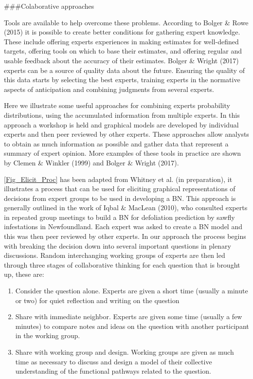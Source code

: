 \documentclass[
]{article}
\begin{document}
\#\#\#Colaborative approaches

Tools are available to help overcome these problems. According to Bolger
\& Rowe (2015) it is possible to create better conditions for gathering
expert knowledge. These include offering experts experiences in making
estimates for well-defined targets, offering tools on which to base
their estimates, and offering regular and usable feedback about the
accuracy of their estimates. Bolger \& Wright (2017) experts can be a
source of quality data about the future. Ensuring the quality of this
data starts by selecting the best experts, training experts in the
normative aspects of anticipation and combining judgments from several
experts.

Here we illustrate some useful approaches for combining experts
probability distributions, using the accumulated information from
multiple experts. In this approach a workshop is held and graphical
models are developed by individual experts and then peer reviewed by
other experts. These approaches allow analysts to obtain as much
information as possible and gather data that represent a summary of
expert opinion. More examples of these tools in practice are shown by
Clemen \& Winkler (1999) and Bolger \& Wright (2017).

\autoref{Fig_Elicit_Proc} has been adapted from Whitney et al. (in
preparation), it illustrates a process that can be used for eliciting
graphical representations of decisions from expert groups to be used in
developing a BN. This approach is generally outlined in the work of
Iqbal \& MacLean (2010), who consulted experts in repeated group
meetings to build a BN for defoliation prediction by sawfly infestations
in Newfoundland. Each expert was asked to create a BN model and this was
then peer reviewed by other experts. In our approach the process begins
with breaking the decision down into several important questions in
plenary discussions. Random interchanging working groups of experts are
then led through three stages of collaborative thinking for each
question that is brought up, these are:

\begin{enumerate}
  \item Consider the question alone. Experts are given a short time (usually a minute or two) for quiet reflection and writing on the question
  \item Share with immediate neighbor. Experts are given some time (usually a few minutes) to compare notes and ideas on the question with another participant in the working group.
  \item Share with working group and design. Working groups are given as much time as necessary to discuss and design a model of their collective understanding of the functional pathways related to the question.
\end{enumerate}
\end{document}
